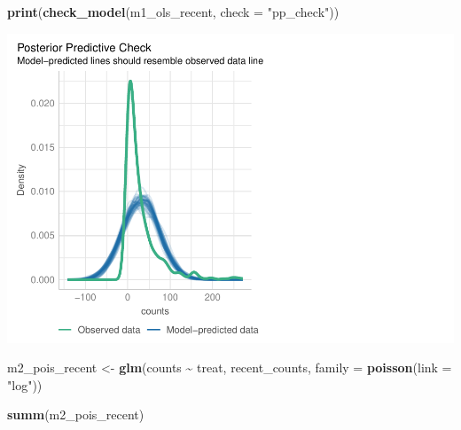 \documentclass[
]{article}
\newenvironment{Shaded}{\begin{snugshade}}{\end{snugshade}}
\newcommand{\AttributeTok}[1]{\textcolor[rgb]{0.13,0.29,0.53}{#1}}
\newcommand{\FunctionTok}[1]{\textcolor[rgb]{0.13,0.29,0.53}{\textbf{#1}}}
\newcommand{\NormalTok}[1]{#1}
\newcommand{\OtherTok}[1]{\textcolor[rgb]{0.56,0.35,0.01}{#1}}
\newcommand{\SpecialCharTok}[1]{\textcolor[rgb]{0.81,0.36,0.00}{\textbf{#1}}}
\newcommand{\StringTok}[1]{\textcolor[rgb]{0.31,0.60,0.02}{#1}}
\begin{document}
\begin{Shaded}
\begin{Highlighting}[]
\FunctionTok{print}\NormalTok{(}\FunctionTok{check\_model}\NormalTok{(m1\_ols\_recent, }\AttributeTok{check =} \StringTok{"pp\_check"}\NormalTok{))}
\end{Highlighting}
\end{Shaded}

\includegraphics{hw1-lobstrs-eds241_files/figure-latex/unnamed-chunk-34-1.pdf}

\begin{Shaded}
\begin{Highlighting}[]
\NormalTok{m2\_pois\_recent }\OtherTok{\textless{}{-}} \FunctionTok{glm}\NormalTok{(counts }\SpecialCharTok{\textasciitilde{}}\NormalTok{ treat,}
\NormalTok{               recent\_counts,}
               \AttributeTok{family =} \FunctionTok{poisson}\NormalTok{(}\AttributeTok{link =} \StringTok{"log"}\NormalTok{))}

\FunctionTok{summ}\NormalTok{(m2\_pois\_recent)}
\end{Highlighting}
\end{Shaded}
\end{document}
